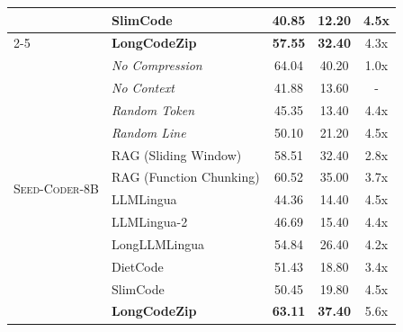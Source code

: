 \documentclass[10pt,conference]{IEEEtran}
\newcommand{\approach}{{LongCodeZip}\xspace} %
\begin{document}
\begin{table}[t]
{\begin{tabular}{llccc}
    & SlimCode & 40.85 & 12.20 & 4.5x \\
    \cmidrule(lr){2-5}
    & \cellcolor{cyan!10}\textbf{\approach} & \cellcolor{cyan!10}\textbf{57.55} & \cellcolor{cyan!10}\textbf{32.40} & \cellcolor{cyan!10}4.3x \\
    \midrule
    \multirow{13}{*}{\textsc{Seed-Coder-8B}} & \textit{No Compression} & 64.04 & 40.20 & 1.0x \\
    & \textit{No Context} & 41.88 & 13.60 & - \\
    \cmidrule{2-5}
    & \textit{Random Token} & 45.35 & 13.40 & 4.4x \\
    & \textit{Random Line} & 50.10 & 21.20 & 4.5x \\
    \cmidrule{2-5}
    & RAG (Sliding Window) & 58.51 & 32.40 & 2.8x \\
    & RAG (Function Chunking) & 60.52 & 35.00 & 3.7x \\
    & LLMLingua & 44.36 & 14.40 & 4.5x \\
    & LLMLingua-2 & 46.69 & 15.40 & 4.4x \\
    & LongLLMLingua & 54.84 & 26.40 & 4.2x \\
    & DietCode & 51.43 & 18.80 & 3.4x \\
    & SlimCode & 50.45 & 19.80 & 4.5x \\
    \cmidrule(lr){2-5}
    & \cellcolor{cyan!10}\textbf{\approach} & \cellcolor{cyan!10}\textbf{63.11} & \cellcolor{cyan!10}\textbf{37.40} & \cellcolor{cyan!10}5.6x \\
    \bottomrule
    \end{tabular}
    }
    \label{tab:lcc_results}
\end{table}
\end{document}
